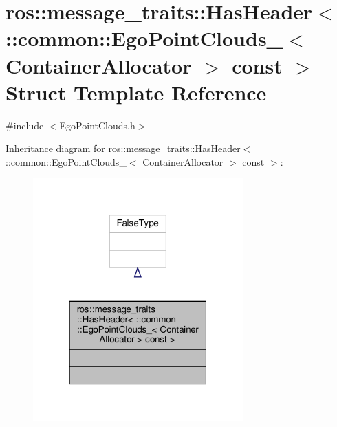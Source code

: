 \hypertarget{structros_1_1message__traits_1_1HasHeader_3_01_1_1common_1_1EgoPointClouds___3_01ContainerAllocator_01_4_01const_01_4}{}\section{ros\+:\+:message\+\_\+traits\+:\+:Has\+Header$<$ \+:\+:common\+:\+:Ego\+Point\+Clouds\+\_\+$<$ Container\+Allocator $>$ const $>$ Struct Template Reference}
\label{structros_1_1message__traits_1_1HasHeader_3_01_1_1common_1_1EgoPointClouds___3_01ContainerAllocator_01_4_01const_01_4}


{\ttfamily \#include $<$Ego\+Point\+Clouds.\+h$>$}



Inheritance diagram for ros\+:\+:message\+\_\+traits\+:\+:Has\+Header$<$ \+:\+:common\+:\+:Ego\+Point\+Clouds\+\_\+$<$ Container\+Allocator $>$ const $>$\+:\nopagebreak
\begin{figure}[H]
\begin{center}
\leavevmode
\includegraphics[width=229pt]{d0/d2b/structros_1_1message__traits_1_1HasHeader_3_01_1_1common_1_1EgoPointClouds___3_01ContainerAlloca4f7f78618f1faced96b950bff1ff5526}
\end{center}
\end{figure}


